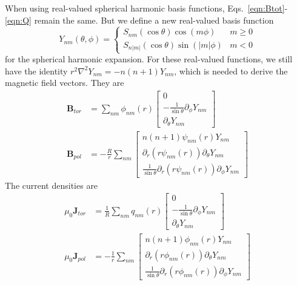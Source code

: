 \documentclass{article}
\newcommand{\B}{\mathbf{B}}
\newcommand{\J}{\mathbf{J}}
\begin{document}
When using real-valued spherical harmonic basis functions, Eqs.~\eqref{eqn:Btot}-\eqref{eqn:Q}
remain the same. But we define a new real-valued basis function
\begin{equation}
Y_{nm}(\theta,\phi) = \left\{
\begin{array}{cc}
S_{nm}(\cos{\theta}) \cos{(m \phi)} & m \ge 0 \\
S_{n|m|}(\cos{\theta}) \sin{(|m| \phi)} & m < 0
\end{array}
\right.
\end{equation}
for the spherical harmonic expansion. For these real-valued functions, we still
have the identity $r^2 \nabla^2 Y_{nm} = -n(n+1) Y_{nm}$, which is needed to
derive the magnetic field vectors. They are
\begin{align}
\B_{tor} &= \sum_{nm} \phi_{nm}(r)
\left[
\begin{array}{c}
0 \\
-\frac{1}{\sin{\theta}} \partial_{\phi} Y_{nm} \\
\partial_{\theta} Y_{nm}
\end{array}
\right] \\
\B_{pol} &= -\frac{R}{r} \sum_{nm}
\left[
\begin{array}{c}
n(n+1) \psi_{nm}(r) Y_{nm} \\
\partial_r \left( r \psi_{nm}(r) \right) \partial_{\theta} Y_{nm} \\
\frac{1}{\sin{\theta}} \partial_r \left( r \psi_{nm}(r) \right) \partial_{\phi} Y_{nm}
\end{array}
\right]
\end{align}
The current densities are
\begin{align}
\mu_0 \J_{tor} &= \frac{1}{R} \sum_{nm} q_{nm}(r)
\left[
\begin{array}{c}
0 \\
-\frac{1}{\sin{\theta}} \partial_{\phi} Y_{nm} \\
\partial_{\theta} Y_{nm}
\end{array}
\right] \\
\mu_0 \J_{pol} &= -\frac{1}{r} \sum_{nm}
\left[
\begin{array}{c}
n(n+1) \phi_{nm}(r) Y_{nm} \\
\partial_r \left( r \phi_{nm}(r) \right) \partial_{\theta} Y_{nm} \\
\frac{1}{\sin{\theta}} \partial_r \left( r \phi_{nm}(r) \right) \partial_{\phi} Y_{nm}
\end{array}
\right]
\end{align}
\end{document}
